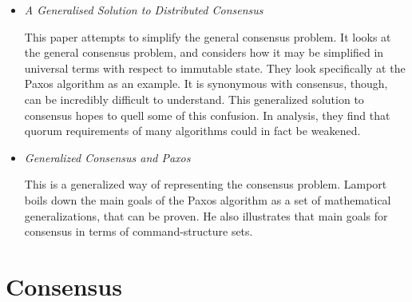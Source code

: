 \documentclass{article}
\begin{document}
\begin{itemize}

	\item
	\textit{A Generalised Solution to Distributed Consensus} \cite{HowardGeneralized}

	This paper attempts to simplify the general consensus problem. It looks at the general consensus problem, and considers how it may be simplified in universal terms with respect to immutable state. They look specifically at the Paxos algorithm as an example. 
	It is synonymous with consensus, though, can be incredibly difficult to understand. This generalized solution to consensus hopes to quell some of this confusion.
	In analysis, they find that quorum requirements of many algorithms could in fact be weakened.

	\item
	\textit{Generalized Consensus and Paxos} \cite{lamport2005generalized}

	This is a generalized way of representing the consensus problem.
	Lamport boils down the main goals of the Paxos algorithm as a set of mathematical generalizations, that can be proven. He also illustrates that main goals for consensus in terms of command-structure sets.


\end{itemize}

\section{Consensus}
\end{document}
